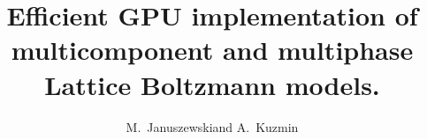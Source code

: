 \documentclass[mathpazo]{cicp}
\begin{document}
\title{Efficient GPU implementation of multicomponent and multiphase Lattice Boltzmann models.}

\author[M.~Januszewski and A.~Kuzmin]{M.~Januszewski\corrauth and A.~Kuzmin}
\address{\ Institute of Physics, University of Silesia, 40-007 Katowice, Poland\\
\ Department of Mechanical and Manufacturing Engineering,
Schulich School of Engineering,
University of Calgary, 2500 University Drive NW ,Calgary, Alberta, T2N 1N4 Canada
}

\end{document}
